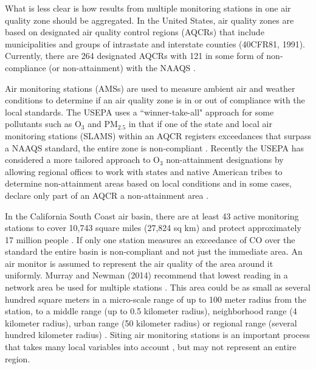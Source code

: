 What is less clear is how results from multiple monitoring stations in one air quality zone should be aggregated. In the United States, air quality zones are based on designated air quality control regions (AQCRs) that include municipalities and groups of intrastate and interstate counties (40CFR81, 1991). Currently, there are 264 designated AQCRs with 121 in some form of non-compliance (or non-attainment) with the NAAQS \citep{USEPA2016a}. 

Air monitoring stations (AMSs) are used to measure ambient air and weather conditions to determine if an air quality zone is in or out of compliance with the local standards. The USEPA uses a ``winner-take-all" approach for some pollutants such as O$_{3}$ and PM$_{2.5}$ in that if one of the state and local air monitoring stations (SLAMS) within an AQCR registers exceedances that surpass a NAAQS standard, the entire zone is non-compliant \citep{USEPA2005a}.  Recently the USEPA has considered a more tailored approach to O$_{3}$ non-attainment designations by allowing regional offices to work with states and native American tribes to determine non-attainment areas based on local conditions and in some cases, declare only part of an AQCR a non-attainment area \citep{McCabe2015}. 

In the California South Coast air basin, there are at least 43 active monitoring stations \citep{CARB2013} to cover 10,743 square miles (27,824 sq km) and protect approximately 17 million people \citep{AQMD2010}.  If only one station measures an exceedance of  CO over the standard the entire basin is non-compliant and not just the immediate area.  An air monitor is assumed to represent the air quality of the area around it uniformly.  Murray and Newman (2014) recommend that lowest reading in a network area be used for multiple stations \citep{Murray2014}. This area could be as small as several hundred square meters in a micro-scale range of up to 100 meter radius from the station, to a middle range (up to 0.5 kilometer radius), neighborhood range (4 kilometer radius), urban range (50 kilometer radius) or regional range (several hundred kilometer radius) \citep{Pan2009}.  Siting air monitoring stations is an important process that takes many local variables into account \citep{Bermudez2010}, but may not represent an entire region.

